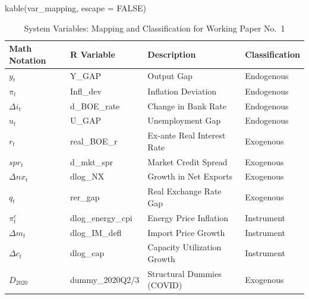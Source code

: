 \documentclass[
  letterpaper,
  DIV=11,
  numbers=noendperiod]{scrartcl}
\newenvironment{Shaded}{\begin{snugshade}}{\end{snugshade}}
\newcommand{\AttributeTok}[1]{\textcolor[rgb]{0.40,0.45,0.13}{#1}}
\newcommand{\ConstantTok}[1]{\textcolor[rgb]{0.56,0.35,0.01}{#1}}
\newcommand{\FunctionTok}[1]{\textcolor[rgb]{0.28,0.35,0.67}{#1}}
\newcommand{\NormalTok}[1]{\textcolor[rgb]{0.00,0.23,0.31}{#1}}
\begin{document}
\begin{Shaded}
\begin{Highlighting}[]
\FunctionTok{kable}\NormalTok{(var\_mapping, }\AttributeTok{escape =} \ConstantTok{FALSE}\NormalTok{)}
\end{Highlighting}
\end{Shaded}

\begin{longtable}[]{@{}
  >{\raggedright\arraybackslash}p{}
  >{\raggedright\arraybackslash}p{}
  >{\raggedright\arraybackslash}p{}
  >{\raggedright\arraybackslash}p{}@{}}

\caption{\label{tbl-variable-mapping}System Variables: Mapping and
Classification for Working Paper No.~1}

\tabularnewline

\toprule\noalign{}
\begin{minipage}[b]{\linewidth}\raggedright
Math Notation
\end{minipage} & \begin{minipage}[b]{\linewidth}\raggedright
R Variable
\end{minipage} & \begin{minipage}[b]{\linewidth}\raggedright
Description
\end{minipage} & \begin{minipage}[b]{\linewidth}\raggedright
Classification
\end{minipage} \\
\midrule\noalign{}
\endhead
\bottomrule\noalign{}
\endlastfoot
\(y_t\) & Y\_GAP & Output Gap & Endogenous \\
\(\pi_t\) & Infl\_dev & Inflation Deviation & Endogenous \\
\(\Delta i_t\) & d\_BOE\_rate & Change in Bank Rate & Endogenous \\
\(u_t\) & U\_GAP & Unemployment Gap & Endogenous \\
\(r_t\) & real\_BOE\_r & Ex-ante Real Interest Rate & Exogenous \\
\(spr_t\) & d\_mkt\_spr & Market Credit Spread & Exogenous \\
\(\Delta nx_t\) & dlog\_NX & Growth in Net Exports & Exogenous \\
\(q_t\) & rer\_gap & Real Exchange Rate Gap & Exogenous \\
\(\pi^{e}_t\) & dlog\_energy\_cpi & Energy Price Inflation &
Instrument \\
\(\Delta m_t\) & dlog\_IM\_defl & Import Price Growth & Instrument \\
\(\Delta c_t\) & dlog\_cap & Capacity Utilization Growth & Instrument \\
\(D_{2020}\) & dummy\_2020Q2/3 & Structural Dummies (COVID) &
Exogenous \\

\end{longtable}
\end{document}
